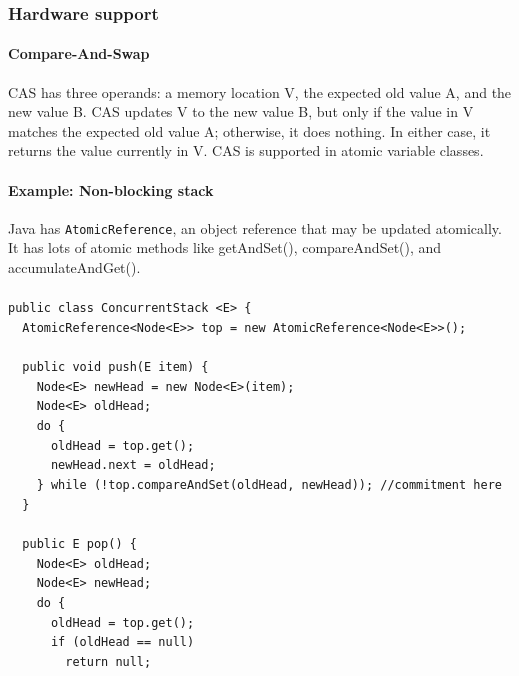 \documentclass{article}
\begin{document}
\subsubsection{Hardware support}
\paragraph{Compare-And-Swap} CAS has three operands: a memory location V, the expected old value A, and the new value B. CAS updates V to the new value B, but only if the value in V matches the expected old value A; otherwise, it does nothing. In either case, it returns the value currently in V. CAS is supported in atomic variable classes.
\paragraph{Example: Non-blocking stack} Java has \lstinline{AtomicReference}, an object reference that may be updated atomically. It has lots of atomic methods like getAndSet(), compareAndSet(), and accumulateAndGet().\\\\
\lstinline|public class ConcurrentStack <E> {|\\
\lstinline|  AtomicReference<Node<E>> top = new AtomicReference<Node<E>>();|\\\\
\lstinline|  public void push(E item) {|\\
\lstinline|    Node<E> newHead = new Node<E>(item);|\\
\lstinline|    Node<E> oldHead;|\\
\lstinline|    do {|\\
\lstinline|      oldHead = top.get();|\\
\lstinline|      newHead.next = oldHead;|\\
\lstinline|    } while (!top.compareAndSet(oldHead, newHead)); //commitment here|\\
\lstinline|  }|\\\\
\lstinline|  public E pop() {|\\
\lstinline|    Node<E> oldHead;|\\
\lstinline|    Node<E> newHead;|\\
\lstinline|    do {|\\
\lstinline|      oldHead = top.get();|\\
\lstinline|      if (oldHead == null)|\\
\lstinline|        return null;|\\
\end{document}
